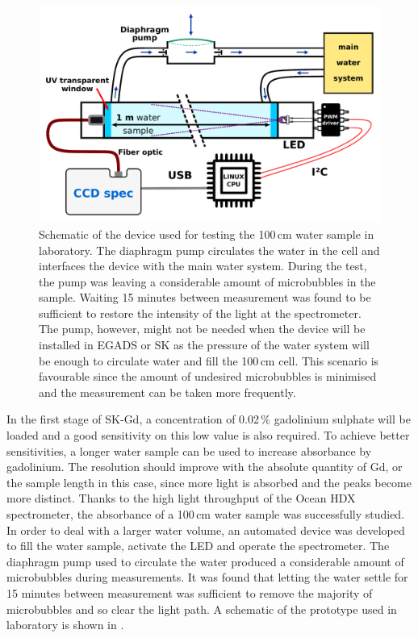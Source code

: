 \begin{figure}
	\centering
	\includegraphics[width=0.7\linewidth]{pics/Device.pdf}
	\caption[Schematic of the device used for testing the 100\,cm water sample]%
		{Schematic of the device used for testing the 100\,cm water sample in laboratory.
		The diaphragm pump circulates the water in the cell and interfaces the device with the main water system.
		During the test, the pump was leaving a considerable amount of microbubbles in the sample.
		Waiting 15 minutes between measurement was found to be sufficient to restore the intensity of the light at %
		the spectrometer.
		The pump, however, might not be needed when the device will be installed in EGADS or SK as the %
		pressure of the water system will be enough to circulate water and fill the 100\,cm cell.
		This scenario is favourable since the amount of undesired microbubbles is minimised and the %
		measurement can be taken more frequently.}
	\label{fig:gad_device}
\end{figure}

In the first stage of SK-Gd, a concentration of 0.02\,\% gadolinium sulphate %
will be loaded and a good sensitivity on this low value is also required.
To achieve better sensitivities, a longer water sample can be used to increase absorbance by gadolinium.
The resolution should improve with the absolute quantity of Gd, or the sample length in this case, %
since more light is absorbed and the peaks become more distinct.
Thanks to the high light throughput of the Ocean HDX spectrometer, %
the absorbance of a 100\,cm water sample was successfully studied.
In order to deal with a larger water volume, an automated device was developed to fill the water sample, %
activate the LED and operate the spectrometer.
The diaphragm pump used to circulate the water produced a considerable amount of microbubbles during measurements.
It was found that letting the water settle for 15 minutes between measurement was sufficient %
to remove the majority of microbubbles and so clear the light path.
A schematic of the prototype used in laboratory is shown in .

